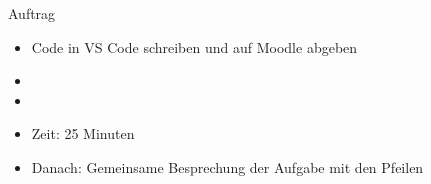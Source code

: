 \begin{frame}[fragile]{Auftrag}%
    \begin{itemize}
        \item Code in VS Code schreiben und auf Moodle abgeben
        \item {}
        \item {}
        \item Zeit: 25 Minuten
        \item Danach: Gemeinsame Besprechung der Aufgabe mit den Pfeilen
    \end{itemize}
\end{frame}


